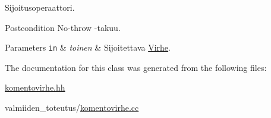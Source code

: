 Sijoitusoperaattori. 

\begin{DoxyPostcond}{Postcondition}
No-\/throw -\/takuu.
\end{DoxyPostcond}

\begin{DoxyParams}[1]{Parameters}
\mbox{\tt in}  & {\em toinen} & Sijoitettava {\ttfamily \hyperlink{class_julkinen_1_1_virhe}{Virhe}}. \\
\hline
\end{DoxyParams}


The documentation for this class was generated from the following files\+:\begin{DoxyCompactItemize}
\item 
\hyperlink{komentovirhe_8hh}{komentovirhe.\+hh}\item 
valmiiden\+\_\+toteutus/\hyperlink{komentovirhe_8cc}{komentovirhe.\+cc}\end{DoxyCompactItemize}
